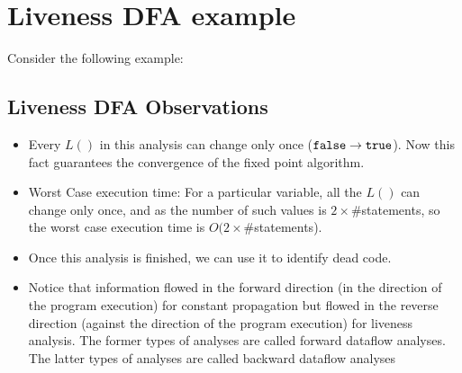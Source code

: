 \setlength{\parindent}{0pt}

\section{Liveness DFA example}

Consider the following example:

    
 

\subsection{Liveness DFA Observations}
\begin{itemize}
    \item Every $L()$ in this analysis can change only once (${\tt false} \rightarrow {\tt true}$). Now this fact guarantees the convergence of the fixed point algorithm.
    \item Worst Case execution time: For a particular variable, all the $L()$ can change only once, and as the number of such values is $2 \times \#$statements, so the worst case execution time is $O(2 \times \#$statements).
    \item Once this analysis is finished, we can use it to identify dead code.
    \item Notice that information flowed in the forward direction (in the direction of the program execution) for constant propagation but flowed in the reverse direction (against the direction of the program execution) for liveness analysis.
    The former types of analyses are called forward dataflow analyses. The latter types of analyses are called backward dataflow analyses
\end{itemize}